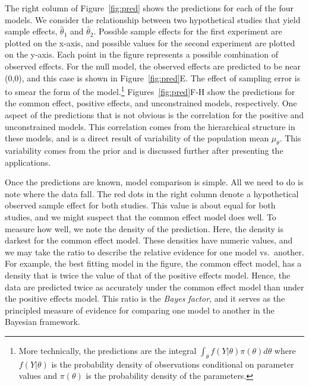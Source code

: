 \documentclass[english,man]{apa6}
\theoremstyle{definition}
\theoremstyle{definition}
\theoremstyle{remark}
\begin{document}
The right column of Figure~\ref{fig:pred} shows the predictions for each
of the four models. We consider the relationship between two
hypothetical studies that yield sample effects, \(\hat{\theta}_1\) and
\(\hat{\theta}_2\). Possible sample effects for the first experiment are
plotted on the x-axis, and possible values for the second experiment are
plotted on the y-axis. Each point in the figure represents a possible
combination of observed effects. For the null model, the observed
effects are predicted to be near (0,0), and this case is shown in
Figure~\ref{fig:pred}E. The effect of sampling error is to smear the
form of the model.\footnote{More technically, the predictions are the
  integral \(\int_\theta f(Y|\theta)\pi(\theta)d\theta\) where
  \(f(Y|\theta)\) is the probability density of observations conditional
  on parameter values and \(\pi(\theta)\) is the probability density of
  the parameters.} Figures~\ref{fig:pred}F-H show the predictions for
the common effect, positive effects, and unconstrained models,
respectively. One aspect of the predictions that is not obvious is the
correlation for the positive and unconstrained models. This correlation
comes from the hierarchical structure in these models, and is a direct
result of variability of the population mean \(\mu_\theta\). This
variability comes from the prior and is discussed further after
presenting the applications.

Once the predictions are known, model comparison is simple. All we need
to do is note where the data fall. The red dots in the right column
denote a hypothetical observed sample effect for both studies. This
value is about equal for both studies, and we might suspect that the
common effect model does well. To measure how well, we note the density
of the prediction. Here, the density is darkest for the common effect
model. These densities have numeric values, and we may take the ratio to
describe the relative evidence for one model vs.~another. For example,
the best fitting model in the figure, the common effect model, has a
density that is twice the value of that of the positive effects model.
Hence, the data are predicted twice as accurately under the common
effect model than under the positive effects model. This ratio is the
\emph{Bayes factor}, and it serves as the principled measure of evidence
for comparing one model to another in the Bayesian framework.
\end{document}
